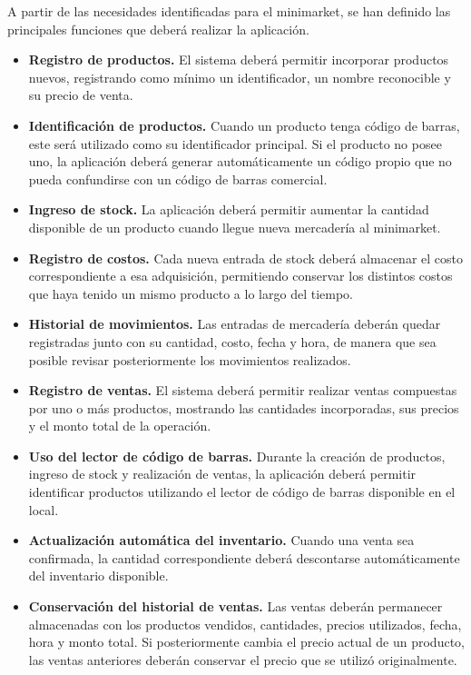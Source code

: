 \documentclass[10pt,a4paper]{article}
\begin{document}
A partir de las necesidades identificadas para el minimarket, se han definido las principales funciones que deberá realizar la aplicación.
\begin{itemize}[leftmargin=*]
\item  \textbf{Registro de productos.}  
El sistema deberá permitir incorporar productos nuevos, registrando como mínimo un identificador, un nombre reconocible y su precio de venta.

\item \textbf{Identificación de productos.}  
Cuando un producto tenga código de barras, este será utilizado como su identificador principal. Si el producto no posee uno, la aplicación deberá generar automáticamente un código propio que no pueda confundirse con un código de barras comercial.

\item \textbf{Ingreso de stock.}  
La aplicación deberá permitir aumentar la cantidad disponible de un producto cuando llegue nueva mercadería al minimarket.

\item \textbf{Registro de costos.}  
Cada nueva entrada de stock deberá almacenar el costo correspondiente a esa adquisición, permitiendo conservar los distintos costos que haya tenido un mismo producto a lo largo del tiempo.

\item \textbf{Historial de movimientos.}  
Las entradas de mercadería deberán quedar registradas junto con su cantidad, costo, fecha y hora, de manera que sea posible revisar posteriormente los movimientos realizados.

\item \textbf{Registro de ventas.}  
El sistema deberá permitir realizar ventas compuestas por uno o más productos, mostrando las cantidades incorporadas, sus precios y el monto total de la operación.

\item \textbf{Uso del lector de código de barras.}  
Durante la creación de productos, ingreso de stock y realización de ventas, la aplicación deberá permitir identificar productos utilizando el lector de código de barras disponible en el local.

\item \textbf{Actualización automática del inventario.}  
Cuando una venta sea confirmada, la cantidad correspondiente deberá descontarse automáticamente del inventario disponible.

\item \textbf{Conservación del historial de ventas.}  
Las ventas deberán permanecer almacenadas con los productos vendidos, cantidades, precios utilizados, fecha, hora y monto total. Si posteriormente cambia el precio actual de un producto, las ventas anteriores deberán conservar el precio que se utilizó originalmente.


\end{itemize}
\end{document}
